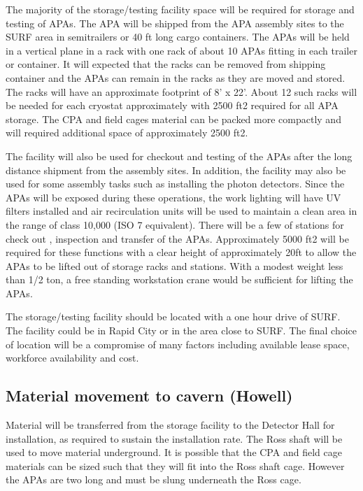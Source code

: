 The majority of the storage/testing facility space will be required for storage and testing of APAs. The APA will be shipped from the APA assembly sites to the SURF area in semitrailers or 40 ft long cargo containers. The APAs 
will be held in a vertical plane in a rack with one rack of about 10 APAs fitting in each trailer or container. It will expected that the racks can be removed from shipping container and the APAs can remain in the racks as they are 
moved and stored.  The racks will have an approximate footprint of 8' x 22'. About 12 such racks will be needed for each cryostat approximately with 2500 ft2 required for all APA storage. The CPA and field cages material can be packed more compactly and will required additional space of approximately 2500 ft2.

The facility will also be used for checkout and testing of the APAs after the long distance shipment from the assembly sites. In addition, the facility may also be used for some assembly tasks such as installing the photon 
detectors. Since the APAs will be exposed during these operations, the work lighting will have UV filters installed and air recirculation units will be used to maintain a clean area in the range of class 10,000 (ISO 7 equivalent). 
There will be a few of stations for check out , inspection and transfer of the APAs. Approximately 5000 ft2 will be required for these functions with a clear height of approximately 20ft to allow the APAs to be lifted out of storage 
racks and stations. With a modest weight less than 1/2 ton, a free standing workstation crane would be sufficient for lifting the APAs.

The storage/testing facility should be located with a one hour drive of SURF. The facility could be in Rapid City or in the area close to SURF. The final choice of location will be a compromise of many factors including available 
lease space, workforce availability and cost.

\subsection{Material movement to cavern (Howell)}
\label{fd:install:fsinstall:mat:movement}

Material will be transferred from the storage facility to the Detector Hall for installation, as required to sustain the installation rate. The Ross shaft will be used to move material underground. It is possible that the CPA and field cage 
materials can be sized such that they will fit into the Ross shaft cage. However the APAs are two long and must be slung underneath the Ross cage. 

